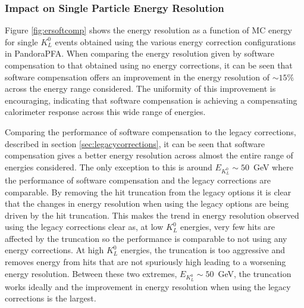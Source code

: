 
\subsubsection{Impact on Single Particle Energy Resolution}
\label{sec:softcomper}
Figure \ref{fig:ersoftcomp} shows the energy resolution as a function of MC energy for single $K^{0}_{L}$ events obtained using the various energy correction configurations in PandoraPFA.  When comparing the energy resolution given by software compensation to that obtained using no energy corrections, it can be seen that software compensation offers an improvement in the energy resolution of $\sim 15 \%$ across the energy range considered.  The uniformity of this improvement is encouraging, indicating that software compensation is achieving a compensating calorimeter response across this wide range of energies.  

Comparing the performance of software compensation to the legacy corrections, described in section \ref{sec:legacycorrections}, it can be seen that software compensation gives a better energy resolution across almost the entire range of energies considered.  The only exception to this is around $E_{K^{0}_{L}} \sim 50$~GeV where the performance of software compensation and the legacy corrections are comparable.  By removing the hit truncation from the legacy options it is clear that the changes in energy resolution when using the legacy options are being driven by the hit truncation.  This makes the trend in energy resolution observed using the legacy corrections clear as, at low $K^{0}_{L}$ energies, very few hits are affected by the truncation so the performance is comparable to not using any energy corrections.  At high $K^{0}_{L}$ energies, the truncation is too aggressive and removes energy from hits that are not spuriously high leading to a worsening energy resolution.  Between these two extremes, $E_{K^{0}_{L}} \sim 50$~GeV, the truncation works ideally and the improvement in energy resolution when using the legacy corrections is the largest.  

